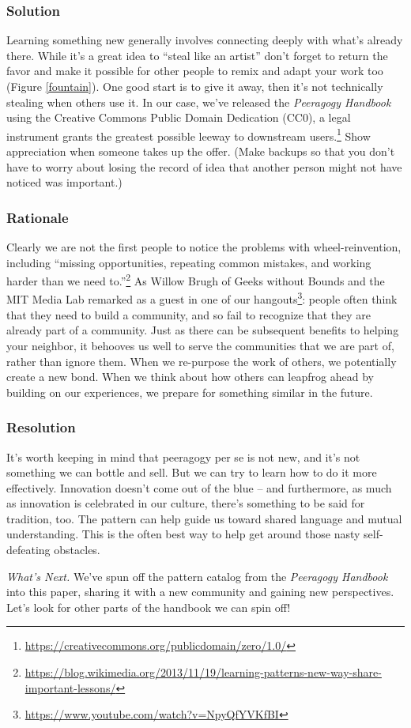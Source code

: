 \subsubsection*{Solution} Learning something new generally involves connecting deeply with what's already there.  While it's a great idea to ``steal like an artist'' don't forget to return the favor and make it possible for other people to remix and adapt your work too (Figure \ref{fountain}).  One good start is to give it away, then it's not technically stealing when others use it.
In our case, we've released the \emph{Peeragogy Handbook} using the Creative Commons Public Domain Dedication (CC0), a legal instrument grants the greatest possible leeway to downstream users.\footnote{\url{https://creativecommons.org/publicdomain/zero/1.0/}}  Show appreciation when someone takes up the offer.  (Make backups so that you don't have to worry about losing the record of idea that another person might not have noticed was important.)

\subsubsection*{Rationale} 
Clearly we are not the first people to notice the problems with wheel-reinvention, including ``missing opportunities, repeating common mistakes, and working harder than we need to.''\footnote{\url{https://blog.wikimedia.org/2013/11/19/learning-patterns-new-way-share-important-lessons/}}  As Willow Brugh of Geeks without Bounds and the MIT Media Lab remarked as a guest in one of our hangouts\footnote{\url{https://www.youtube.com/watch?v=NpyQfYVKfBI}}: people often think that they need to build a community, and so fail to recognize that they are already part of a community.  Just as there can be subsequent benefits to helping your neighbor, it behooves us well to serve the communities that we are part of, rather than ignore them.   When we re-purpose the work of others, we potentially create a new bond.   When we think about how others can leapfrog ahead by building on our experiences, we prepare for something similar in the future.

\subsubsection*{Resolution}   It's worth keeping in mind that peeragogy per se is not new, and it's not something we can bottle and sell.  But we can try to learn how to do it more effectively.  Innovation doesn't come out of the blue -- and furthermore, as much as innovation is celebrated in our culture, there's something to be said for tradition, too.   The pattern  can help guide us toward shared language and mutual understanding.  This is the often best way to help get around those nasty self-defeating obstacles.

\begin{framed}
\emph{What's Next.}
We've spun off the pattern catalog from the \emph{Peeragogy Handbook} into this paper, sharing it with a new community and gaining new perspectives.  Let's look for other parts of the handbook we can spin off!
\end{framed}



    
    
